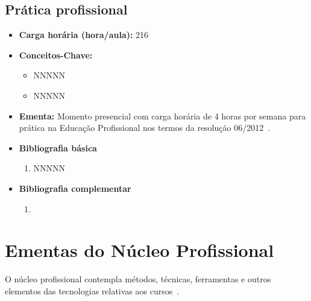 \documentclass[11pt,fleqn]{book} %
\begin{document}
\subsection{Prática profissional}\label{disc:pratica}
\begin{itemize}
	\item \textbf{Carga horária (hora/aula):} 216
	\item \textbf{Conceitos-Chave:}
	\begin{itemize}
		\item NNNNN
		\item NNNNN
	\end{itemize}
	\item \textbf{Ementa:} Momento presencial com carga horária de 4 horas por semana para prática na Educação Profissional nos termos da resolução 06/2012~\cite{Resolucao06De2012}.
	\item \textbf{Bibliografia básica}
	\begin{enumerate}
		\item NNNNN
	\end{enumerate}
	\item \textbf{Bibliografia complementar}
	\begin{enumerate}
		\item 
	\end{enumerate}	
\end{itemize}

\newpage
\section{Ementas do Núcleo Profissional}\label{ementasTecnico}
\indent

O núcleo profissional contempla métodos, técnicas, ferramentas e outros elementos das tecnologias relativas aos cursos~\cite{Resolucao06De2012}.

\newpage
\end{document}
